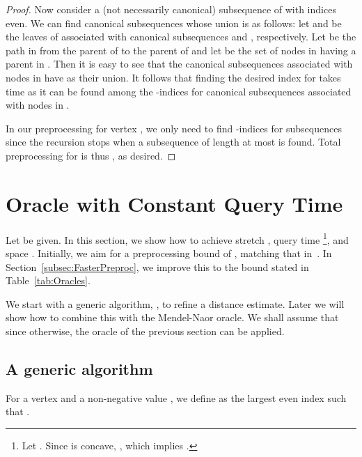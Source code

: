 \documentclass[11pt]{article}
\begin{document}
\begin{proof}
Now consider a (not necessarily canonical) subsequence  of  with indices  even. We can
find  canonical subsequences whose union is  as follows: let  and  be the leaves
of  associated with canonical subsequences  and , respectively. Let  be the path in  from the
parent of  to the parent of  and let  be the set of nodes in  having a parent in . Then it is
easy to see that the  canonical subsequences associated with nodes in  have  as their union.
It follows that finding the desired index  for  takes  time as it can be found among the -indices for canonical
subsequences associated with nodes in .

In our preprocessing for vertex , we only need to find -indices for  subsequences since
the recursion stops when a subsequence of length at most  is found.
Total preprocessing for  is thus , as desired.
\end{proof}

\section{Oracle with Constant Query Time}\label{sec:ConstQuery}
Let  be given. In this section, we show how to achieve stretch , query time
\footnote{Let .
Since  is concave, , which implies
.},
and space . Initially, we aim for a preprocessing bound of , matching that
in~\cite{MendelNaor}. In Section~\ref{subsec:FasterPreproc}, we improve this to the bound stated in
Table~\ref{tab:Oracles}.

We start with a generic algorithm, , to refine a distance
estimate. Later we will show how to combine this with the Mendel-Naor oracle.
We shall assume that  since otherwise, the oracle of the previous section can be applied.

\subsection{A generic algorithm}\label{subsec:Generic}
For a vertex  and a non-negative value , we define  as the largest even index
 such that .
\end{document}
